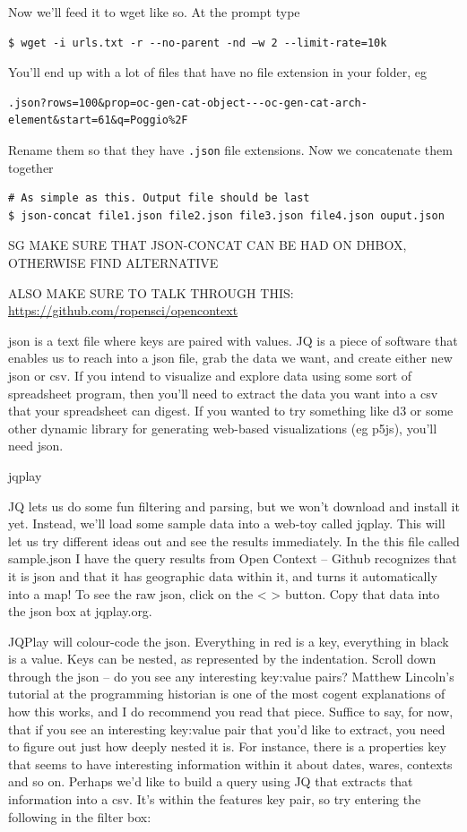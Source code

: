 \documentclass[english,]{book}
\begin{document}
Now we'll feed it to wget like so. At the prompt type

\begin{verbatim}
$ wget -i urls.txt -r --no-parent -nd –w 2 --limit-rate=10k
\end{verbatim}

You'll end up with a lot of files that have no file extension in your
folder, eg

\begin{verbatim}
.json?rows=100&prop=oc-gen-cat-object---oc-gen-cat-arch-element&start=61&q=Poggio%2F
\end{verbatim}

Rename them so that they have \texttt{.json} file extensions. Now we
concatenate them together

\begin{verbatim}
# As simple as this. Output file should be last
$ json-concat file1.json file2.json file3.json file4.json ouput.json
\end{verbatim}

SG MAKE SURE THAT JSON-CONCAT CAN BE HAD ON DHBOX, OTHERWISE FIND
ALTERNATIVE

ALSO MAKE SURE TO TALK THROUGH THIS:
\url{https://github.com/ropensci/opencontext}

json is a text file where keys are paired with values. JQ is a piece of
software that enables us to reach into a json file, grab the data we
want, and create either new json or csv. If you intend to visualize and
explore data using some sort of spreadsheet program, then you'll need to
extract the data you want into a csv that your spreadsheet can digest.
If you wanted to try something like d3 or some other dynamic library for
generating web-based visualizations (eg p5js), you'll need json.

jqplay

JQ lets us do some fun filtering and parsing, but we won't download and
install it yet. Instead, we'll load some sample data into a web-toy
called jqplay. This will let us try different ideas out and see the
results immediately. In the this file called sample.json I have the
query results from Open Context -- Github recognizes that it is json and
that it has geographic data within it, and turns it automatically into a
map! To see the raw json, click on the \textless{} \textgreater{}
button. Copy that data into the json box at jqplay.org.

JQPlay will colour-code the json. Everything in red is a key, everything
in black is a value. Keys can be nested, as represented by the
indentation. Scroll down through the json -- do you see any interesting
key:value pairs? Matthew Lincoln's tutorial at the programming historian
is one of the most cogent explanations of how this works, and I do
recommend you read that piece. Suffice to say, for now, that if you see
an interesting key:value pair that you'd like to extract, you need to
figure out just how deeply nested it is. For instance, there is a
properties key that seems to have interesting information within it
about dates, wares, contexts and so on. Perhaps we'd like to build a
query using JQ that extracts that information into a csv. It's within
the features key pair, so try entering the following in the filter box:
\end{document}
